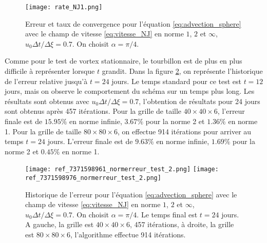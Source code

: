 \begin{figure}[htbp]
\begin{center}
\texttt{[image: rate\_NJ1.png]}
\end{center}
\caption{Erreur et taux de convergence pour l'équation \eqref{eq:advection_sphere} avec le champ de vitesse \eqref{eq:vitesse_NJ} en norme $1$, $2$ et $\infty$, $u_0 \Delta t / \Delta \xi = 0.7$. On choisit $\alpha = \pi/4$.}
\label{fig:rate1_NJ}
\end{figure} 

Comme pour le test de vortex stationnaire, le tourbillon est de plus en plus difficile à représenter lorsque $t$ grandit. Dans la figure \ref{fig:NJ24jours}, on représente l'historique de l'erreur relative jusqu'à $t=24$ jours. Le temps standard pour ce test est $t=12$ jours, mais on observe le comportement du schéma sur un temps plus long. Les résultats sont obtenus avec $u_0 \Delta t / \Delta \xi = 0.7$, l'obtention de résultats pour 24 jours sont obtenus après 457 itérations. Pour la grille de taille $40 \times 40 \times 6$, l'erreur finale est de $15.95\%$ en norme infinie, $3.67\%$ pour la norme 2 et $1.36\%$ en norme 1. Pour la grille de taille $80 \times 80 \times 6$, on effectue 914 itérations pour arriver au temps $t=24$ jours. L'erreur finale est de $9.63\%$ en norme infinie, $1.69\%$ pour la norme 2 et $0.45\%$ en norme 1.

\begin{figure}[htbp]
\begin{center}
\texttt{[image: ref\_7371598961\_normerreur\_test\_2.png]}
\texttt{[image: ref\_7371598976\_normerreur\_test\_2.png]}
\end{center}
\caption{Historique de l'erreur pour l'équation \eqref{eq:advection_sphere} avec le champ de vitesse \eqref{eq:vitesse_NJ} en norme $1$, $2$ et $\infty$, $u_0 \Delta t / \Delta \xi = 0.7$. On choisit $\alpha = \pi/4$. Le temps final est $t=24$ jours. A gauche, la grille est $40 \times 40  \times 6$, 457 itérations, à droite, la grille est $80 \times 80  \times 6$, l'algorithme effectue 914 itérations.}
\label{fig:NJ24jours}
\end{figure} 

